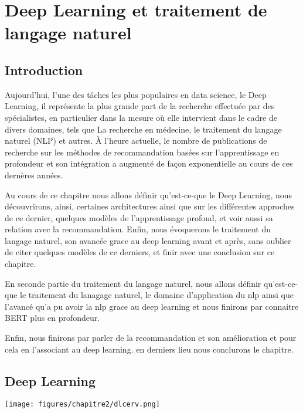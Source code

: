 \chapter{\textbf{Deep Learning et traitement de langage naturel}}\label{chapitre2}

\section{Introduction}
\par Aujourd’hui, l’une des tâches les plus populaires en data science, le Deep Learning, il représente la plus grande part de la recherche effectuée par des spécialistes, en particulier dans la mesure où elle intervient dans le cadre de divers domaines, tels que La recherche en médecine, le traitement du langage naturel (NLP) et autres. À l’heure actuelle, le nombre de publications de recherche sur les méthodes de recommandation basées sur l'apprentissage en profondeur et son intégration a augmenté de façon exponentielle au cours de ces dernères années.

\par Au cours de ce chapitre nous allons définir qu'est-ce-que le Deep Learning, nous découvrirons, ainsi,  certaines architectures ainsi que sur les différentes approches de ce dernier, quelques modèles de l'apprentissage profond, et voir aussi sa relation avec la recommandation. 
Enfin, nous évoquerons le traitement du langage naturel, son avancée grace au deep learning avant et après, sans oublier de citer quelques modèles de ce derniers, et finir avec une conclusion sur ce chapitre.


\par En seconde partie du traitement du langage naturel, nous allons définir qu'est-ce-que le traitement du lanagage naturel, le domaine d'application du nlp ainsi que l'avancé qu'a pu avoir la nlp grace au deep learning et nous finirons par connaitre BERT plus en profondeur.

\par Enfin, nous finirons par parler de la recommandation et son amélioration et pour cela en l'associant au deep learning. en derniers lieu nous conclurons le chapitre. 

\section{Deep Learning}
    
    \texttt{[image: figures/chapitre2/dlcerv.png]} %
    
